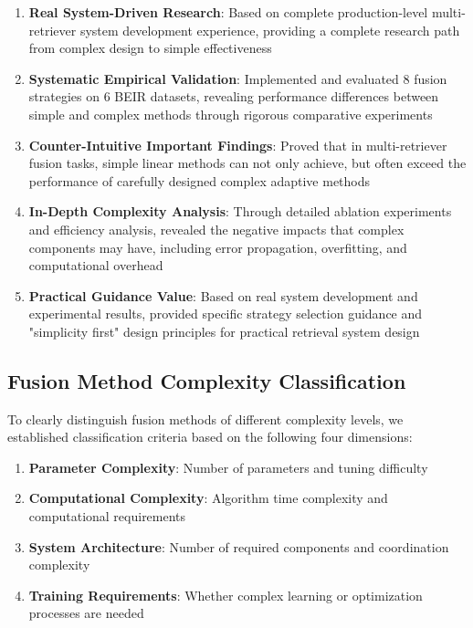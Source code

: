 \documentclass[letterpaper]{article} %
\begin{document}
\begin{enumerate}
\item \textbf{Real System-Driven Research}: Based on complete production-level multi-retriever system development experience, providing a complete research path from complex design to simple effectiveness
\item \textbf{Systematic Empirical Validation}: Implemented and evaluated 8 fusion strategies on 6 BEIR datasets, revealing performance differences between simple and complex methods through rigorous comparative experiments
\item \textbf{Counter-Intuitive Important Findings}: Proved that in multi-retriever fusion tasks, simple linear methods can not only achieve, but often exceed the performance of carefully designed complex adaptive methods
\item \textbf{In-Depth Complexity Analysis}: Through detailed ablation experiments and efficiency analysis, revealed the negative impacts that complex components may have, including error propagation, overfitting, and computational overhead
\item \textbf{Practical Guidance Value}: Based on real system development and experimental results, provided specific strategy selection guidance and "simplicity first" design principles for practical retrieval system design
\end{enumerate}

\subsection{Fusion Method Complexity Classification}

To clearly distinguish fusion methods of different complexity levels, we established classification criteria based on the following four dimensions:

\begin{enumerate}
\item \textbf{Parameter Complexity}: Number of parameters and tuning difficulty
\item \textbf{Computational Complexity}: Algorithm time complexity and computational requirements
\item \textbf{System Architecture}: Number of required components and coordination complexity
\item \textbf{Training Requirements}: Whether complex learning or optimization processes are needed
\end{enumerate}
\end{document}
